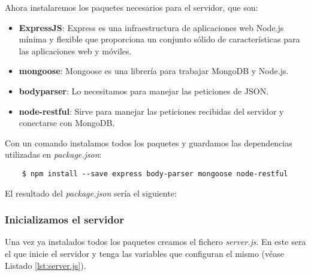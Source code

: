 Ahora instalaremos los paquetes necesarios para el servidor, que son:

\begin{itemize}
    \item \textbf{ExpressJS}: Express es una infraestructura de aplicaciones web Node.js mínima y flexible que proporciona un conjunto sólido de características para las aplicaciones web y móviles.
    \item \textbf{mongoose}: Mongoose es una librería para trabajar MongoDB y Node.js.
    \item \textbf{bodyparser}: Lo necesitamos para manejar las peticiones de JSON.
    \item \textbf{node-restful}: Sirve para manejar las peticiones recibidas del servidor y conectarse con MongoDB.
\end{itemize}

Con un comando instalamos todos los paquetes y guardamos las dependencias utilizadas en \textit{package.json}:

\begin{lstlisting}
    $ npm install --save express body-parser mongoose node-restful
\end{lstlisting}

El resultado del \textit{package.json} sería el siguiente:


\subsubsection{Inicializamos el servidor}

Una vez ya instalados todos los paquetes creamos el fichero \textit{server.js}. En este sera el que inicie el servidor y tenga las variables que configuran el mismo (véase Listado \ref{lst:server.js}). 


